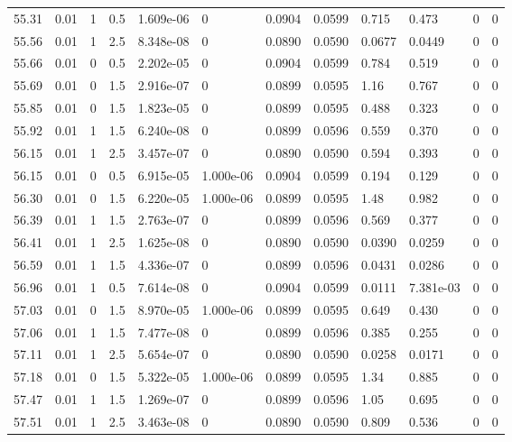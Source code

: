 \documentclass[preview]{standalone}
\begin{document}
{{{{{{{{{{{\begin{tabular}{L{1.2cm}C{1.2cm} C{0.3cm}C{0.5cm} C{1.4cm}C{1.4cm} C{1.4cm}C{1.4cm} C{1.6cm}C{1.6cm} C{1.6cm}C{1.6cm}}
  55.31  &  0.01  & 1     & 0.5 &  1.609e-06  & 0  &  0.0904&   0.0599& 0.715 & 0.473   &  0 & 0  \\ 
  55.56  &  0.01  & 1     & 2.5 &  8.348e-08  & 0  &  0.0890&   0.0590& 0.0677 & 0.0449   &  0 & 0  \\ 
  55.66  &  0.01  & 0     & 0.5 &  2.202e-05  & 0  &  0.0904&   0.0599& 0.784 & 0.519   &  0 & 0  \\ 
  55.69  &  0.01  & 0     & 1.5 &  2.916e-07  & 0  &  0.0899&   0.0595& 1.16 & 0.767   &  0 & 0  \\ 
  55.85  &  0.01  & 0     & 1.5 &  1.823e-05  & 0  &  0.0899&   0.0595& 0.488 & 0.323   &  0 & 0  \\ 
  55.92  &  0.01  & 1     & 1.5 &  6.240e-08  & 0  &  0.0899&   0.0596& 0.559 & 0.370   &  0 & 0  \\ 
  56.15  &  0.01  & 1     & 2.5 &  3.457e-07  & 0  &  0.0890&   0.0590& 0.594 & 0.393   &  0 & 0  \\ 
  56.15  &  0.01  & 0     & 0.5 &  6.915e-05  & 1.000e-06  &  0.0904&   0.0599& 0.194 & 0.129   &  0 & 0  \\ 
  56.30  &  0.01  & 0     & 1.5 &  6.220e-05  & 1.000e-06  &  0.0899&   0.0595& 1.48 & 0.982   &  0 & 0  \\ 
  56.39  &  0.01  & 1     & 1.5 &  2.763e-07  & 0  &  0.0899&   0.0596& 0.569 & 0.377   &  0 & 0  \\ 
  56.41  &  0.01  & 1     & 2.5 &  1.625e-08  & 0  &  0.0890&   0.0590& 0.0390 & 0.0259   &  0 & 0  \\ 
  56.59  &  0.01  & 1     & 1.5 &  4.336e-07  & 0  &  0.0899&   0.0596& 0.0431 & 0.0286   &  0 & 0  \\ 
  56.96  &  0.01  & 1     & 0.5 &  7.614e-08  & 0  &  0.0904&   0.0599& 0.0111 & 7.381e-03   &  0 & 0  \\ 
  57.03  &  0.01  & 0     & 1.5 &  8.970e-05  & 1.000e-06  &  0.0899&   0.0595& 0.649 & 0.430   &  0 & 0  \\ 
  57.06  &  0.01  & 1     & 1.5 &  7.477e-08  & 0  &  0.0899&   0.0596& 0.385 & 0.255   &  0 & 0  \\ 
  57.11  &  0.01  & 1     & 2.5 &  5.654e-07  & 0  &  0.0890&   0.0590& 0.0258 & 0.0171   &  0 & 0  \\ 
  57.18  &  0.01  & 0     & 1.5 &  5.322e-05  & 1.000e-06  &  0.0899&   0.0595& 1.34 & 0.885   &  0 & 0  \\ 
  57.47  &  0.01  & 1     & 1.5 &  1.269e-07  & 0  &  0.0899&   0.0596& 1.05 & 0.695   &  0 & 0  \\ 
  57.51  &  0.01  & 1     & 2.5 &  3.463e-08  & 0  &  0.0890&   0.0590& 0.809 & 0.536   &  0 & 0  \\ 

\end{tabular}}}}}}}}}}}}
\end{document}
